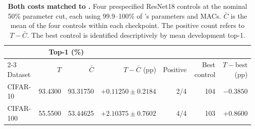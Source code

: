 \begin{table}[tbp]
\centering
\small
\setlength{\tabcolsep}{5pt}
\caption{\textbf{Both costs matched to \Tilt{}.} Four prespecified ResNet18 controls at the nominal 50\% parameter cut, each using 99.9--100\% of \Tilt{}'s parameters and MACs. $\bar C$ is the mean of the four controls within each checkpoint. The positive count refers to $T-\bar C$. The best control is identified descriptively by mean development top-1.}
\label{tab:dual-tilt}
\begin{tabular}{@{}lrrrrrr@{}}
\toprule
 & \multicolumn{2}{c}{Top-1 (\%)} &  &  &  &  \\
\cmidrule(lr){2-3}
Dataset & $T$ & $\bar C$ & $T-\bar C$ (pp) & Positive & Best control & $T-$best (pp) \\
\midrule
CIFAR-10 & 93.4300 & 93.31750 & $+0.11250\pm 0.2184$ & 2/4 & 104 & $-0.3850$ \\
CIFAR-100 & 55.5500 & 53.44625 & $+2.10375\pm 0.7602$ & 4/4 & 103 & $+0.8600$ \\
\bottomrule
\end{tabular}
\end{table}
